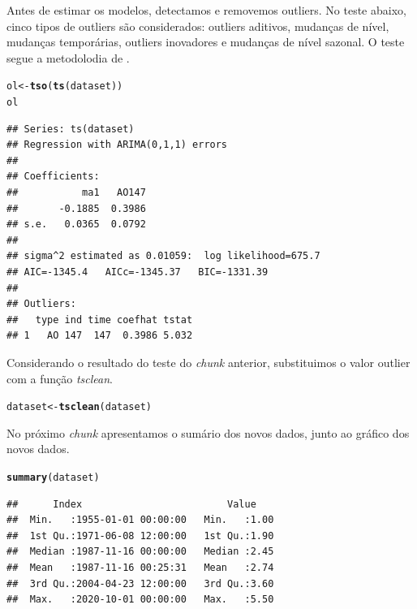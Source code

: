 \documentclass{article}\usepackage[]{graphicx}\usepackage[]{color}
\makeatletter
\newcommand{\hlstd}[1]{\textcolor[rgb]{0.345,0.345,0.345}{#1}}%
\newcommand{\hlkwb}[1]{\textcolor[rgb]{0.69,0.353,0.396}{#1}}%
\newcommand{\hlkwd}[1]{\textcolor[rgb]{0.737,0.353,0.396}{\textbf{#1}}}%
\newenvironment{kframe}{%
 \def\at@end@of@kframe{}%
 \ifinner\ifhmode%
  \def\at@end@of@kframe{\end{minipage}}%
  \begin{minipage}{\columnwidth}%
 \fi\fi%
 \def\FrameCommand##1{\hskip\@totalleftmargin \hskip-\fboxsep
 \colorbox{shadecolor}{##1}\hskip-\fboxsep
     \hskip-\linewidth \hskip-\@totalleftmargin \hskip\columnwidth}%
 \MakeFramed {\advance\hsize-\width
   \@totalleftmargin\z@ \linewidth\hsize
   \@setminipage}}%
 {\par\unskip\endMakeFramed%
 \at@end@of@kframe}
\newenvironment{knitrout}{}{} %
\makeatother
\begin{document}
    Antes de estimar os modelos, detectamos e removemos outliers. No teste abaixo, cinco tipos de outliers são considerados: outliers aditivos, mudanças de nível, mudanças temporárias, outliers inovadores e mudanças de nível sazonal. O teste segue a metodolodia de \cite{chungliu}.

\begin{knitrout}
\color{fgcolor}\begin{kframe}
\begin{alltt}
\hlstd{ol} \hlkwb{<-} \hlkwd{tso}\hlstd{(}\hlkwd{ts}\hlstd{(dataset))}
\hlstd{ol}
\end{alltt}
\begin{verbatim}
## Series: ts(dataset) 
## Regression with ARIMA(0,1,1) errors 
## 
## Coefficients:
##           ma1   AO147
##       -0.1885  0.3986
## s.e.   0.0365  0.0792
## 
## sigma^2 estimated as 0.01059:  log likelihood=675.7
## AIC=-1345.4   AICc=-1345.37   BIC=-1331.39
## 
## Outliers:
##   type ind time coefhat tstat
## 1   AO 147  147  0.3986 5.032
\end{verbatim}
\end{kframe}
\end{knitrout}
  
    Considerando o resultado do teste do \textit{chunk} anterior, substituimos o valor outlier com a função \textit{tsclean}.

\begin{knitrout}
\color{fgcolor}\begin{kframe}
\begin{alltt}
\hlstd{dataset} \hlkwb{<-} \hlkwd{tsclean}\hlstd{(dataset)}
\end{alltt}
\end{kframe}
\end{knitrout}
  
    No próximo \textit{chunk} apresentamos o sumário dos novos dados, junto ao gráfico dos novos dados.
  
\begin{knitrout}
\color{fgcolor}\begin{kframe}
\begin{alltt}
\hlkwd{summary}\hlstd{(dataset)}
\end{alltt}
\begin{verbatim}
##      Index                         Value     
##  Min.   :1955-01-01 00:00:00   Min.   :1.00  
##  1st Qu.:1971-06-08 12:00:00   1st Qu.:1.90  
##  Median :1987-11-16 00:00:00   Median :2.45  
##  Mean   :1987-11-16 00:25:31   Mean   :2.74  
##  3rd Qu.:2004-04-23 12:00:00   3rd Qu.:3.60  
##  Max.   :2020-10-01 00:00:00   Max.   :5.50
\end{verbatim}
\end{kframe}
\end{knitrout}
\end{document}

